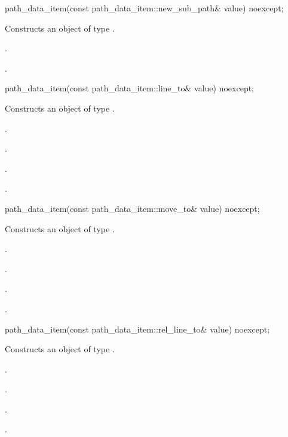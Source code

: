 \begin{itemdecl}
path_data_item(const path_data_item::new_sub_path& value) noexcept;
\end{itemdecl}
\begin{itemdescr}
\pnum
\effects
Constructs an object of type .

\pnum
\postconditions
{}.

\pnum
{}.

\end{itemdescr}

\begin{itemdecl}
path_data_item(const path_data_item::line_to& value) noexcept;
\end{itemdecl}
\begin{itemdescr}
\pnum
\effects
Constructs an object of type .

\pnum
\postconditions
{}.

\pnum
{}.

\pnum
{}.

\pnum
{}.

\end{itemdescr}

\begin{itemdecl}
path_data_item(const path_data_item::move_to& value) noexcept;
\end{itemdecl}
\begin{itemdescr}
\pnum
\effects
Constructs an object of type .

\pnum
\postconditions
{}.

\pnum
{}.

\pnum
{}.

\pnum
{}.

\end{itemdescr}

\begin{itemdecl}
path_data_item(const path_data_item::rel_line_to& value) noexcept;
\end{itemdecl}
\begin{itemdescr}
\pnum
\effects
Constructs an object of type .

\pnum
\postconditions
{}.

\pnum
{}.

\pnum
{}.

\pnum
{}.

\end{itemdescr}

